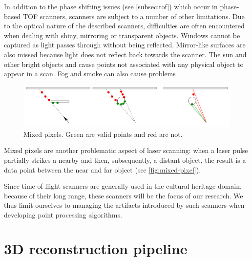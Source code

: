 In addition to the phase shifting issues (see \ref{subsec:tof}) which occur in phase-based TOF scanners, scanners are subject to a number of other limitations. Due to the optical nature of the described scanners, difficulties are often encountered when dealing with shiny, mirroring or transparent objects. Windows cannot be captured as light passes through without being reflected. Mirror-like surfaces are also missed because light does not reflect back towards the scanner. The sun and other bright objects and cause points not associated with any physical object to appear in a scan. Fog and smoke can also cause problems \cite{Ruther2011}.


\begin{figure}[ht]
  \centering
  \includegraphics[width=1\linewidth]{images/mixed-pixel}
  \caption{Mixed pixels. Green are valid points and red are not. \cite{Tuley2005}}
  \label{fig:mixed-pixel}
\end{figure}

Mixed pixels are another problematic aspect of laser scanning: when a laser pulse partially strikes a nearby and then, subsequently, a distant object, the result is a data point between the near and far object \cite{Tuley2005} (see \autoref{fig:mixed-pixel}).


Since time of flight scanners are generally used in the cultural heritage domain, because of their long range, these scanners will be the focus of our research. We thus limit ourselves to managing the artifacts introduced by such scanners when developing point processing algorithms.


\section{3D reconstruction pipeline} \label{sec:pipeline}


